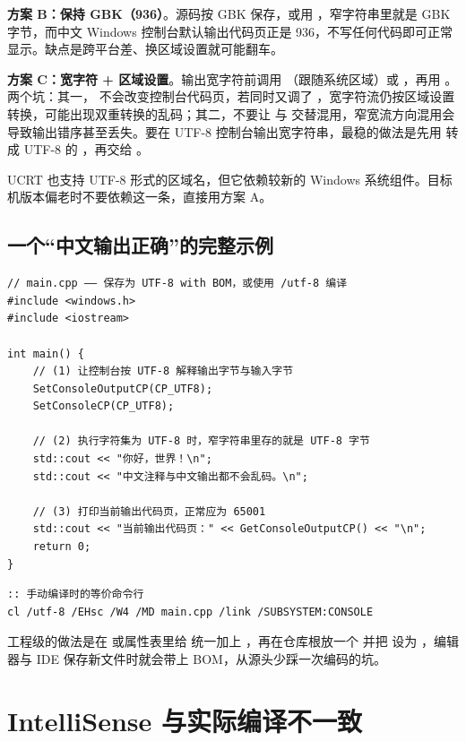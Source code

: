 \textbf{方案 B：保持 GBK（936）}。源码按 GBK 保存，或用 ，窄字符串里就是 GBK 字节，而中文 Windows 控制台默认输出代码页正是 936，不写任何代码即可正常显示。缺点是跨平台差、换区域设置就可能翻车。

\textbf{方案 C：宽字符 + 区域设置}。输出宽字符前调用 （跟随系统区域）或 ，再用 。两个坑：其一， 不会改变控制台代码页，若同时又调了 ，宽字符流仍按区域设置转换，可能出现双重转换的乱码；其二，不要让  与  交替混用，窄宽流方向混用会导致输出错序甚至丢失。要在 UTF-8 控制台输出宽字符串，最稳的做法是先用  转成 UTF-8 的 ，再交给 。

\begin{warnbox}[注意]
UCRT 也支持 UTF-8 形式的区域名，但它依赖较新的 Windows 系统组件。目标机版本偏老时不要依赖这一条，直接用方案 A。
\end{warnbox}
\subsection{一个“中文输出正确”的完整示例}
\begin{lstlisting}[style=cppstyle]
// main.cpp —— 保存为 UTF-8 with BOM，或使用 /utf-8 编译
#include <windows.h>
#include <iostream>

int main() {
    // (1) 让控制台按 UTF-8 解释输出字节与输入字节
    SetConsoleOutputCP(CP_UTF8);
    SetConsoleCP(CP_UTF8);

    // (2) 执行字符集为 UTF-8 时，窄字符串里存的就是 UTF-8 字节
    std::cout << "你好，世界！\n";
    std::cout << "中文注释与中文输出都不会乱码。\n";

    // (3) 打印当前输出代码页，正常应为 65001
    std::cout << "当前输出代码页：" << GetConsoleOutputCP() << "\n";
    return 0;
}
\end{lstlisting}
\begin{lstlisting}[style=shellstyle]
:: 手动编译时的等价命令行
cl /utf-8 /EHsc /W4 /MD main.cpp /link /SUBSYSTEM:CONSOLE
\end{lstlisting}
工程级的做法是在  或属性表里给  统一加上 ，再在仓库根放一个  并把  设为 ，编辑器与 IDE 保存新文件时就会带上 BOM，从源头少踩一次编码的坑。
\section{IntelliSense 与实际编译不一致}
